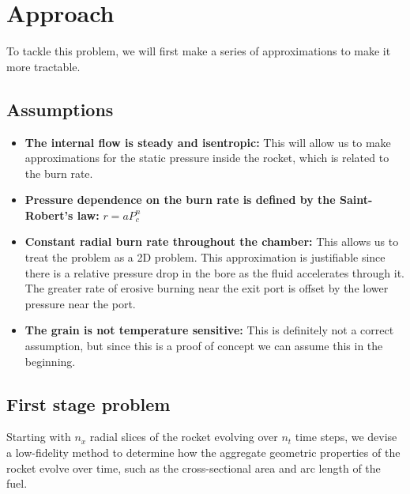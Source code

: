 \section{Approach}

To tackle this problem, we will first make a series of approximations to make it more tractable.

\subsection{Assumptions}
\label{sec:assumptions}

\begin{itemize}
	\item \textbf{The internal flow is steady and isentropic:} This will allow us to make approximations for the static pressure inside the rocket, which is related to the burn rate.
	\item \textbf{Pressure dependence on the burn rate is defined by the Saint-Robert's law:} $r = a P_c^n$
	\item \textbf{Constant radial burn rate throughout the chamber:} This allows us to treat the problem as a 2D problem. This approximation is justifiable since there is a relative pressure drop in the bore as the fluid accelerates through it. The greater rate of erosive burning near the exit port is offset by the lower pressure near the port.
	\item \textbf{The grain is not temperature sensitive:} This is definitely not a correct assumption, but since this is a proof of concept we can assume this in the beginning.
\end{itemize}

\subsection{First stage problem}

Starting with $n_{x}$ radial slices of the rocket evolving over $n_t$ time steps,
we devise a low-fidelity method to determine how the aggregate geometric properties of the rocket
evolve over time, such as the cross-sectional area and arc length of the fuel.


